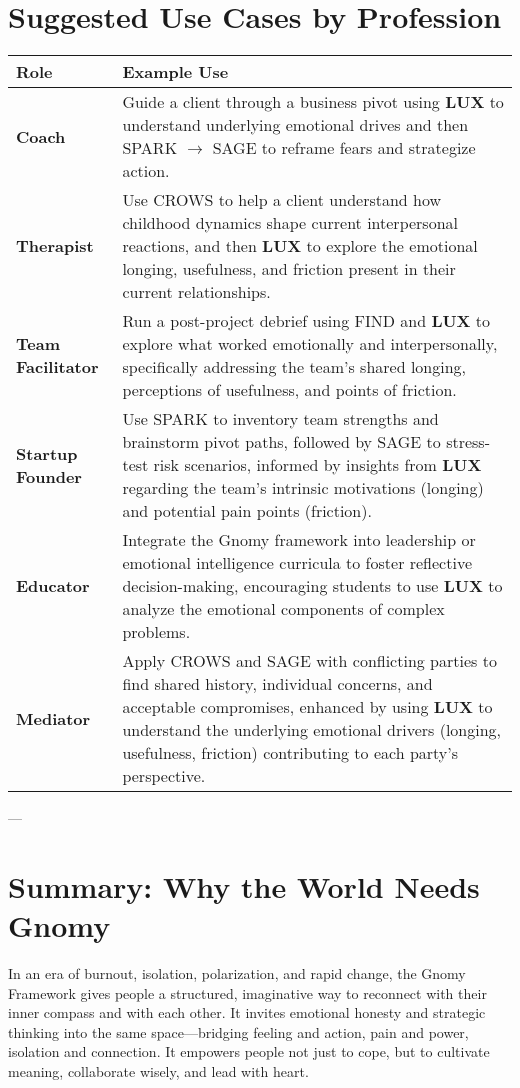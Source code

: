\documentclass{article}
\begin{document}
\section{Suggested Use Cases by Profession}
\begin{tabular}{|p{}|p{}|}
    \hline
    \textbf{Role} & \textbf{Example Use} \\
    \hline
    \textbf{Coach} & Guide a client through a business pivot using \textbf{LUX} to understand underlying emotional drives and then SPARK $\rightarrow$ SAGE to reframe fears and strategize action. \\
    \textbf{Therapist} & Use CROWS to help a client understand how childhood dynamics shape current interpersonal reactions, and then \textbf{LUX} to explore the emotional longing, usefulness, and friction present in their current relationships. \\
    \textbf{Team Facilitator} & Run a post-project debrief using FIND and \textbf{LUX} to explore what worked emotionally and interpersonally, specifically addressing the team's shared longing, perceptions of usefulness, and points of friction. \\
    \textbf{Startup Founder} & Use SPARK to inventory team strengths and brainstorm pivot paths, followed by SAGE to stress-test risk scenarios, informed by insights from \textbf{LUX} regarding the team's intrinsic motivations (longing) and potential pain points (friction). \\
    \textbf{Educator} & Integrate the Gnomy framework into leadership or emotional intelligence curricula to foster reflective decision-making, encouraging students to use \textbf{LUX} to analyze the emotional components of complex problems. \\
    \textbf{Mediator} & Apply CROWS and SAGE with conflicting parties to find shared history, individual concerns, and acceptable compromises, enhanced by using \textbf{LUX} to understand the underlying emotional drivers (longing, usefulness, friction) contributing to each party's perspective. \\
    \hline
\end{tabular}

---

\section{Summary: Why the World Needs Gnomy}
In an era of burnout, isolation, polarization, and rapid change, the Gnomy Framework gives people a structured, imaginative way to reconnect with their inner compass and with each other. It invites emotional honesty and strategic thinking into the same space—bridging feeling and action, pain and power, isolation and connection. It empowers people not just to cope, but to cultivate meaning, collaborate wisely, and lead with heart.
\end{document}
